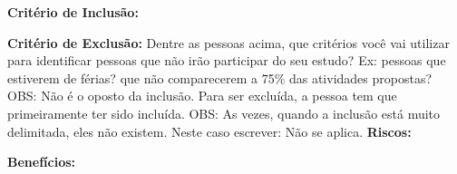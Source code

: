 \documentclass[10pt,a4paper]{article}
\begin{document}
\begin{enumerate}


\textbf{Critério de Inclusão:} %

\textbf{Critério de Exclusão:} Dentre as pessoas acima, que critérios você vai utilizar para identificar pessoas que não irão participar do seu estudo? Ex: pessoas que estiverem de férias? que não comparecerem a 75\% das atividades propostas?
OBS: Não é o oposto da inclusão. Para ser excluída, a pessoa tem que primeiramente ter sido incluída.
OBS: As vezes, quando a inclusão está muito delimitada, eles não existem. Neste caso escrever: Não se aplica.
\textbf{Riscos:} %

\textbf{Benefícios:} %


\end{enumerate}
\end{document}
